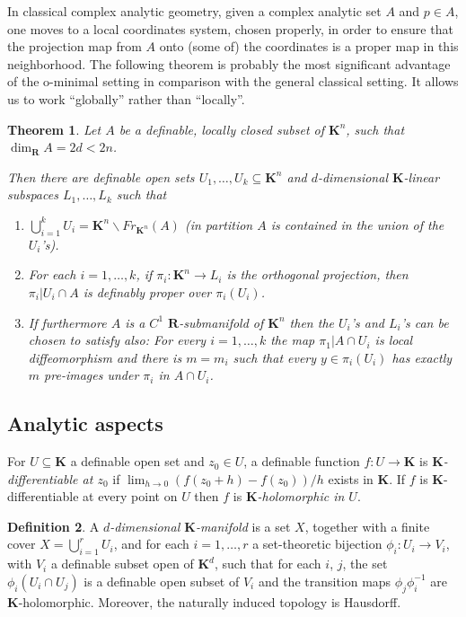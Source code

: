 \documentclass{amsart}
\newtheorem{theorem}{Theorem}[subsection]
\theoremstyle{definition}
\newtheorem{definition}[theorem]{Definition}
\numberwithin{equation}{section}
\begin{document}
In classical complex analytic geometry,
given a complex analytic set $A$ and $p \in A$,
one moves to a local coordinates system,
chosen properly, in order to ensure that the projection map from $A$ onto (some of) the coordinates is a proper map in this neighborhood.
The following theorem is probably the most significant advantage of the o-minimal setting in comparison with the general classical setting.
It allows us to work “globally” rather than “locally”.

\begin{tcolorbox}[title = {The main covering theorem}]
\begin{theorem}
  Let $A$ be a definable, locally closed subset of $\mathbf{K}^n$,
  such that $\dim_{\mathbf{R}}A = 2d < 2n$.

  Then there are definable open sets $U_1,\dots,U_k \subseteq \mathbf{K}^n$ and $d$-dimensional $\mathbf{K}$-linear subspaces $L_1,\dots,L_k$ such that
  \begin{enumerate}[label = {(\arabic*)}]
    \item $\bigcup_{i=1}^k U_i = \mathbf{K}^n\backslash Fr_{\mathbf{K}^n}(A)$ (in partition $A$ is contained in the union of the $U_i$'s).
    \item For each $i = 1,\dots,k$, if $\pi_i:\mathbf{K}^n \to L_i$ is the orthogonal projection, then $\pi_i|U_i\cap A$ is definably proper over $\pi_i(U_i)$.
    \item If furthermore $A$ is a $C^1$ $\mathbf{R}$-submanifold of $\mathbf{K}^n$ then the $U_i$'s and $L_i$'s can be chosen to satisfy also:
    For every $i=1,\dots,k$ the map $\pi_1|A\cap U_i$ is local diffeomorphism and there is $m = m_i$ such that every $y \in \pi_i(U_i)$ has exactly $m$ pre-images under $\pi_i$ in $A \cap U_i$.
  \end{enumerate}
\end{theorem}
\end{tcolorbox}

\subsection{Analytic aspects}
For $U \subseteq \mathbf{K}$ a definable open set and $z_0 \in U$,
a definable function $f: U \to \mathbf{K}$ is \emph{$\mathbf{K}$-differentiable at $z_0$} if $\lim_{h\to 0}(f(z_0+h) - f(z_0))/h$ exists in $\mathbf{K}$.
If $f$ is $\mathbf{K}$-differentiable at every point on $U$ then
$f$ is \emph{$\mathbf{K}$-holomorphic in $U$}.

\begin{definition}
  A \emph{$d$-dimensional $\mathbf{K}$-manifold} is a set $X$,
  together with a finite cover $X = \bigcup_{i=1}^r U_i$,
  and for each $i = 1,\dots,r$ a set-theoretic bijection $\phi_i: U_i \to V_i$,
  with $V_i$ a definable subset open of $\mathbf{K}^d$,
  such that for each $i$, $j$,
  the set $\phi_i(U_i \cap U_j)$ is a definable open subset of $V_i$ and the transition maps $\phi_j \phi_i^{-1}$ are $\mathbf{K}$-holomorphic.
  Moreover, the naturally induced topology is Hausdorff.
\end{definition}
\end{document}
